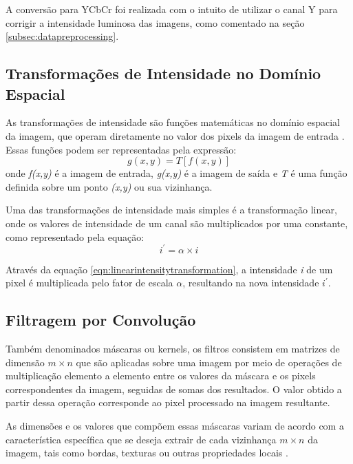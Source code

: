 A conversão para YCbCr foi realizada com o intuito de utilizar o canal Y para corrigir a intensidade luminosa das imagens, como comentado na seção \ref{subsec:datapreprocessing}.

\subsection{Transformações de Intensidade no Domínio Espacial}

As transformações de intensidade são funções matemáticas no domínio espacial da imagem, que operam diretamente no valor dos pixels da imagem de entrada \cite{gonzalez}.
Essas funções podem ser representadas pela expressão:
\begin{equation}
    \label{eqn:intensitytransformation}
    g(x,y) = T\left [ f(x,y) \right ]
\end{equation}
onde \textit{f(x,y)} é a imagem de entrada, \textit{g(x,y)} é a imagem de saída e \textit{T} é uma função definida sobre um ponto \textit{(x,y)} ou sua vizinhança.

Uma das transformações de intensidade mais simples é a transformação linear, onde os valores de intensidade de um canal são multiplicados por uma constante, como representado pela equação:
\begin{equation}
    \label{eqn:linearintensitytransformation}
    i^{'} = \alpha \times i
\end{equation}

Através da equação \ref{eqn:linearintensitytransformation}, a intensidade \textit{i} de um pixel é multiplicada pelo fator de escala $\alpha$, resultando na nova intensidade  $i^{'}$.

\subsection{Filtragem por Convolução}

Também denominados máscaras ou kernels, os filtros consistem em matrizes de dimensão $m \times n$ que são aplicadas sobre uma imagem por meio de operações de multiplicação elemento a elemento entre os valores da máscara e os pixels correspondentes da imagem, seguidas de somas dos resultados. O valor obtido a partir dessa operação corresponde ao pixel processado na imagem resultante.

As dimensões e os valores que compõem essas máscaras variam de acordo com a característica específica que se deseja extrair de cada vizinhança $m \times n$ da imagem, tais como bordas, texturas ou outras propriedades locais \cite{shapiro}.
